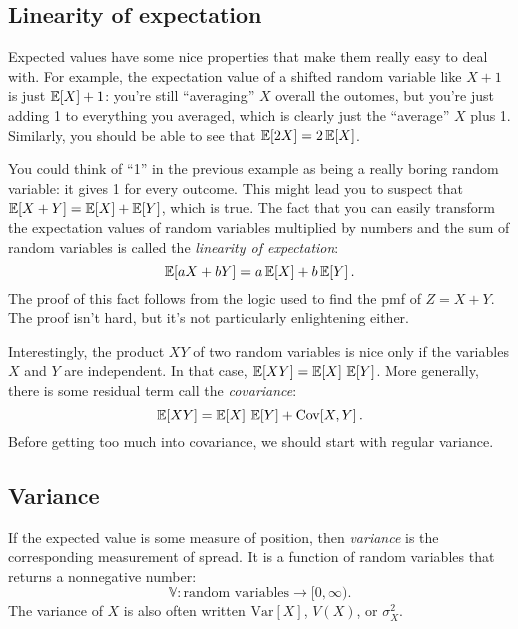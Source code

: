 \subsection{Linearity of expectation}

Expected values have some nice properties that make them really easy to deal
with. For example, the expectation value of a shifted random variable like $X +
1$ is just $\mathbb{E}\!\left[{X}\right] + 1$: you're still ``averaging'' $X$ overall the
outomes, but you're just adding 1 to everything you averaged, which is clearly
just the ``average'' $X$ plus 1. Similarly, you should be able to see that
$\mathbb{E}\!\left[{2X}\right] = 2 \,\mathbb{E}\!\left[{X}\right]$.

You could think of ``1'' in the previous example as being a really boring
random variable: it gives 1 for every outcome. This might lead you to suspect
that $\mathbb{E}\!\left[{X + Y}\right] = \mathbb{E}\!\left[{X}\right] + \mathbb{E}\!\left[{Y}\right]$, which is true. The fact that
you can easily transform the expectation values of random variables multiplied by
numbers and the sum of random variables is called the \emph{linearity of expectation}:
\begin{equation}
\mathbb{E}\!\left[{aX + bY}\right] = a \,\mathbb{E}\!\left[{X}\right] + b \,\mathbb{E}\!\left[{Y}\right].
\end{equation}
The proof of this fact follows from the logic used to find the pmf of $Z = X +
Y$. The proof isn't hard, but it's not particularly enlightening either.

Interestingly, the product $XY$ of two random variables is nice only if the
variables $X$ and $Y$ are independent. In that case, $\mathbb{E}\!\left[{XY}\right] = \mathbb{E}\!\left[{X}\right]\,\mathbb{E}\!\left[{Y}\right]$.
More generally, there is some residual term call the \emph{covariance}:
\begin{equation}
\mathbb{E}\!\left[{XY}\right] = \mathbb{E}\!\left[{X}\right] \, \mathbb{E}\!\left[{Y}\right] + \mathrm{Cov}\!\left[{X, Y}\right].
\end{equation}
Before getting too much into covariance, we should start with regular variance.

\subsection{Variance}

If the expected value is some measure of position, then \emph{variance} is the
corresponding measurement of spread. It is a function of random variables that
returns a nonnegative number:
\begin{equation*}
\mathbb{V} : \text{random variables} \to [0, \infty).
\end{equation*}
The variance of $X$ is also often written $\mathrm{Var}[X]$, $V(X)$, or $\sigma^2_X$.

